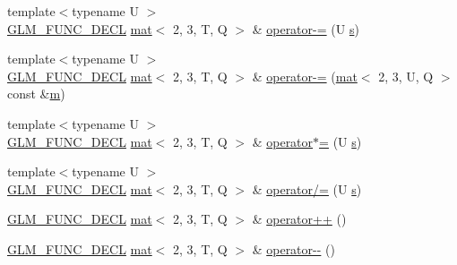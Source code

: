 \begin{DoxyCompactItemize}
\item 
{\footnotesize template$<$typename U $>$ }\\\hyperlink{setup_8hpp_ab2d052de21a70539923e9bcbf6e83a51}{G\+L\+M\+\_\+\+F\+U\+N\+C\+\_\+\+D\+E\+CL} \hyperlink{structglm_1_1mat}{mat}$<$ 2, 3, T, Q $>$ \& \hyperlink{structglm_1_1mat_3_012_00_013_00_01_t_00_01_q_01_4_a4c46929ac7d9b4f097b562df470f892c}{operator-\/=} (U \hyperlink{_s_d_l__opengl_8h_a4af680a6c683f88ed67b76f207f2e6e4}{s})
\item 
{\footnotesize template$<$typename U $>$ }\\\hyperlink{setup_8hpp_ab2d052de21a70539923e9bcbf6e83a51}{G\+L\+M\+\_\+\+F\+U\+N\+C\+\_\+\+D\+E\+CL} \hyperlink{structglm_1_1mat}{mat}$<$ 2, 3, T, Q $>$ \& \hyperlink{structglm_1_1mat_3_012_00_013_00_01_t_00_01_q_01_4_a61e885feef91901245c2b7d7e518b90f}{operator-\/=} (\hyperlink{structglm_1_1mat}{mat}$<$ 2, 3, U, Q $>$ const \&\hyperlink{_s_d_l__opengl__glext_8h_af593500c283bf1a787a6f947f503a5c2}{m})
\item 
{\footnotesize template$<$typename U $>$ }\\\hyperlink{setup_8hpp_ab2d052de21a70539923e9bcbf6e83a51}{G\+L\+M\+\_\+\+F\+U\+N\+C\+\_\+\+D\+E\+CL} \hyperlink{structglm_1_1mat}{mat}$<$ 2, 3, T, Q $>$ \& \hyperlink{structglm_1_1mat_3_012_00_013_00_01_t_00_01_q_01_4_acd7beea4bc1b4fb3e47e1d65663ee654}{operator$\ast$=} (U \hyperlink{_s_d_l__opengl_8h_a4af680a6c683f88ed67b76f207f2e6e4}{s})
\item 
{\footnotesize template$<$typename U $>$ }\\\hyperlink{setup_8hpp_ab2d052de21a70539923e9bcbf6e83a51}{G\+L\+M\+\_\+\+F\+U\+N\+C\+\_\+\+D\+E\+CL} \hyperlink{structglm_1_1mat}{mat}$<$ 2, 3, T, Q $>$ \& \hyperlink{structglm_1_1mat_3_012_00_013_00_01_t_00_01_q_01_4_ae42a9e4f6c5520b785825bb78e32ed23}{operator/=} (U \hyperlink{_s_d_l__opengl_8h_a4af680a6c683f88ed67b76f207f2e6e4}{s})
\item 
\hyperlink{setup_8hpp_ab2d052de21a70539923e9bcbf6e83a51}{G\+L\+M\+\_\+\+F\+U\+N\+C\+\_\+\+D\+E\+CL} \hyperlink{structglm_1_1mat}{mat}$<$ 2, 3, T, Q $>$ \& \hyperlink{structglm_1_1mat_3_012_00_013_00_01_t_00_01_q_01_4_adf02b075f2abd15cc118063f2fe285b5}{operator++} ()
\item 
\hyperlink{setup_8hpp_ab2d052de21a70539923e9bcbf6e83a51}{G\+L\+M\+\_\+\+F\+U\+N\+C\+\_\+\+D\+E\+CL} \hyperlink{structglm_1_1mat}{mat}$<$ 2, 3, T, Q $>$ \& \hyperlink{structglm_1_1mat_3_012_00_013_00_01_t_00_01_q_01_4_a828a596a4d82b6e970290f9c0449da87}{operator-\/-\/} ()
\item 

\end{DoxyCompactItemize}
